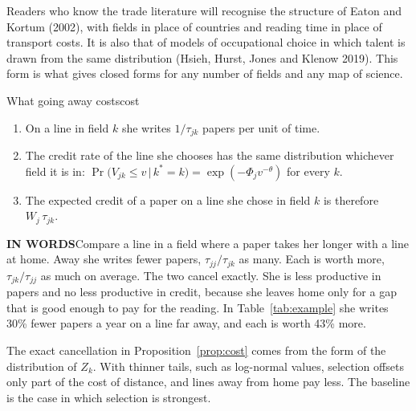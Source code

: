 \documentclass[11pt,letterpaper]{article}
\newcommand{\inwords}{{\sffamily\bfseries\footnotesize\color{hbluedark}IN WORDS}\enspace}
\begin{document}
Readers who know the trade literature will recognise the structure of Eaton and Kortum (2002), with fields in place of countries and reading time in place of transport costs. It is also that of models of occupational choice in which talent is drawn from the same distribution (Hsieh, Hurst, Jones and Klenow 2019). This form is what gives closed forms for any number of fields and any map of science.

\begin{prop}{What going away costs}{cost}
\begin{enumerate}[label=(\roman*),leftmargin=2em]
\item On a line in field $k$ she writes $1/\tau_{jk}$ papers per unit of time.
\item The credit rate of the line she chooses has the same distribution whichever field it is in: $\Pr\big(V_{jk}\le v \,\big|\, k^{*}=k\big)=\exp(-\Phi_j v^{-\theta})$ for every $k$.
\item The expected credit of a paper on a line she chose in field $k$ is therefore $W_j\,\tau_{jk}$.
\end{enumerate}
\tcblower
\inwords Compare a line in a field where a paper takes her longer with a line at home. Away she writes fewer papers, $\tau_{jj}/\tau_{jk}$ as many. Each is worth more, $\tau_{jk}/\tau_{jj}$ as much on average. The two cancel exactly. She is less productive in papers and no less productive in credit, because she leaves home only for a gap that is good enough to pay for the reading. In Table~\ref{tab:example} she writes 30\% fewer papers a year on a line far away, and each is worth 43\% more.
\end{prop}

The exact cancellation in Proposition~\ref{prop:cost} comes from the form of the distribution of $Z_k$. With thinner tails, such as log-normal values, selection offsets only part of the cost of distance, and lines away from home pay less. The baseline is the case in which selection is strongest.
\end{document}
